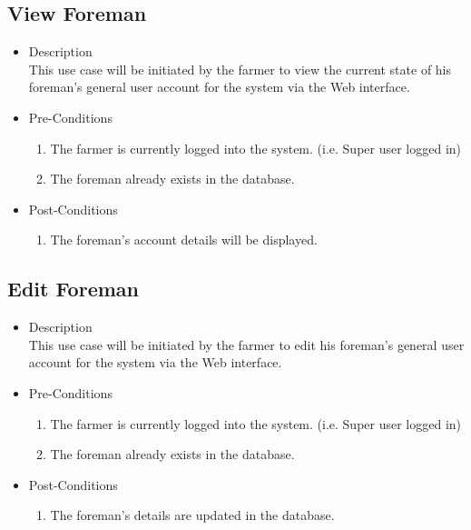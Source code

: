 \documentclass[11pt,fleqn]{book} %
\begin{document}
	\subsection{View Foreman}
	\begin{itemize}
		\item Description\\
		This use case will be initiated by the farmer to view the current state of his foreman’s general user account for the system via the Web interface.
		\item Pre-Conditions
		\begin{enumerate}
			\item The farmer is currently logged into the system. (i.e. Super user logged in)
			\item The foreman already exists in the database.					
		\end{enumerate}
		\item Post-Conditions
		\begin{enumerate}
			\item The foreman’s account details will be displayed.
		\end{enumerate}
	\end{itemize}
	
	\subsection{Edit Foreman}
	\begin{itemize}
		\item Description\\
		This use case will be initiated by the farmer to edit his foreman’s general user account for the system via the Web interface.
		\item Pre-Conditions
		\begin{enumerate}
			\item The farmer is currently logged into the system. (i.e. Super user logged in)
			\item The foreman already exists in the database.					
		\end{enumerate}
		\item Post-Conditions
		\begin{enumerate}
			\item The foreman’s details are updated in the database.
		\end{enumerate}
	\end{itemize}
	
\end{document}
